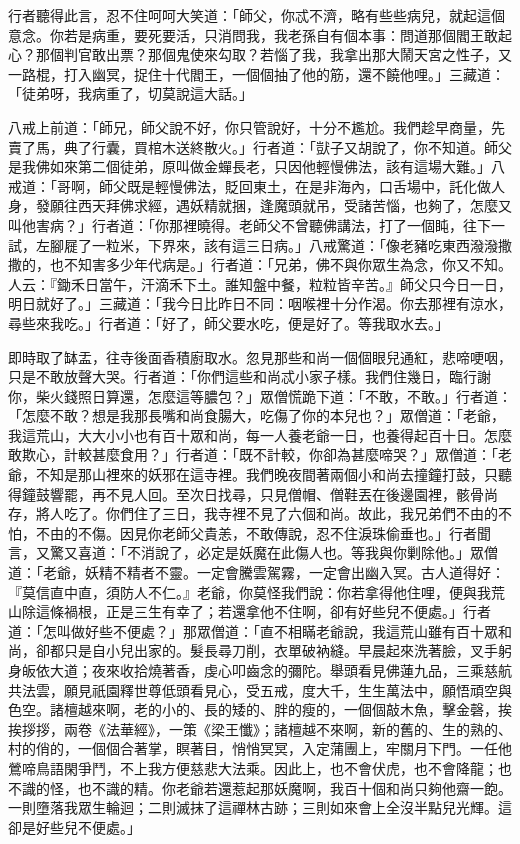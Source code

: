 行者聽得此言，忍不住呵呵大笑道：「師父，你忒不濟，略有些些病兒，就起這個意念。你若是病重，要死要活，只消問我，我老孫自有個本事：問道那個閻王敢起心？那個判官敢出票？那個鬼使來勾取？若惱了我，我拿出那大鬧天宮之性子，又一路棍，打入幽冥，捉住十代閻王，一個個抽了他的筋，還不饒他哩。」三藏道：「徒弟呀，我病重了，切莫說這大話。」

八戒上前道：「師兄，師父說不好，你只管說好，十分不尷尬。我們趁早商量，先賣了馬，典了行囊，買棺木送終散火。」行者道：「獃子又胡說了，你不知道。師父是我佛如來第二個徒弟，原叫做金蟬長老，只因他輕慢佛法，該有這場大難。」八戒道：「哥啊，師父既是輕慢佛法，貶回東土，在是非海內，口舌場中，託化做人身，發願往西天拜佛求經，遇妖精就捆，逢魔頭就吊，受諸苦惱，也夠了，怎麼又叫他害病？」行者道：「你那裡曉得。老師父不曾聽佛講法，打了一個盹，往下一試，左腳屣了一粒米，下界來，該有這三日病。」八戒驚道：「像老豬吃東西潑潑撒撒的，也不知害多少年代病是。」行者道：「兄弟，佛不與你眾生為念，你又不知。人云：『鋤禾日當午，汗滴禾下土。誰知盤中餐，粒粒皆辛苦。』師父只今日一日，明日就好了。」三藏道：「我今日比昨日不同：咽喉裡十分作渴。你去那裡有涼水，尋些來我吃。」行者道：「好了，師父要水吃，便是好了。等我取水去。」

即時取了缽盂，往寺後面香積廚取水。忽見那些和尚一個個眼兒通紅，悲啼哽咽，只是不敢放聲大哭。行者道：「你們這些和尚忒小家子樣。我們住幾日，臨行謝你，柴火錢照日算還，怎麼這等膿包？」眾僧慌跪下道：「不敢，不敢。」行者道：「怎麼不敢？想是我那長嘴和尚食腸大，吃傷了你的本兒也？」眾僧道：「老爺，我這荒山，大大小小也有百十眾和尚，每一人養老爺一日，也養得起百十日。怎麼敢欺心，計較甚麼食用？」行者道：「既不計較，你卻為甚麼啼哭？」眾僧道：「老爺，不知是那山裡來的妖邪在這寺裡。我們晚夜間著兩個小和尚去撞鐘打鼓，只聽得鐘鼓響罷，再不見人回。至次日找尋，只見僧帽、僧鞋丟在後邊園裡，骸骨尚存，將人吃了。你們住了三日，我寺裡不見了六個和尚。故此，我兄弟們不由的不怕，不由的不傷。因見你老師父貴恙，不敢傳說，忍不住淚珠偷垂也。」行者聞言，又驚又喜道：「不消說了，必定是妖魔在此傷人也。等我與你剿除他。」眾僧道：「老爺，妖精不精者不靈。一定會騰雲駕霧，一定會出幽入冥。古人道得好：『莫信直中直，須防人不仁。』老爺，你莫怪我們說：你若拿得他住哩，便與我荒山除這條禍根，正是三生有幸了；若還拿他不住啊，卻有好些兒不便處。」行者道：「怎叫做好些不便處？」那眾僧道：「直不相瞞老爺說，我這荒山雖有百十眾和尚，卻都只是自小兒出家的。髮長尋刀削，衣單破衲縫。早晨起來洗著臉，叉手躬身皈依大道；夜來收拾燒著香，虔心叩齒念的彌陀。舉頭看見佛蓮九品，三乘慈航共法雲，願見祇園釋世尊低頭看見心，受五戒，度大千，生生萬法中，願悟頑空與色空。諸檀越來啊，老的小的、長的矮的、胖的瘦的，一個個敲木魚，擊金磬，挨挨拶拶，兩卷《法華經》，一策《梁王懺》；諸檀越不來啊，新的舊的、生的熟的、村的俏的，一個個合著掌，瞑著目，悄悄冥冥，入定蒲團上，牢關月下門。一任他鶯啼鳥語閑爭鬥，不上我方便慈悲大法乘。因此上，也不會伏虎，也不會降龍；也不識的怪，也不識的精。你老爺若還惹起那妖魔啊，我百十個和尚只夠他齋一飽。一則墮落我眾生輪迴；二則滅抹了這禪林古跡；三則如來會上全沒半點兒光輝。這卻是好些兒不便處。」

